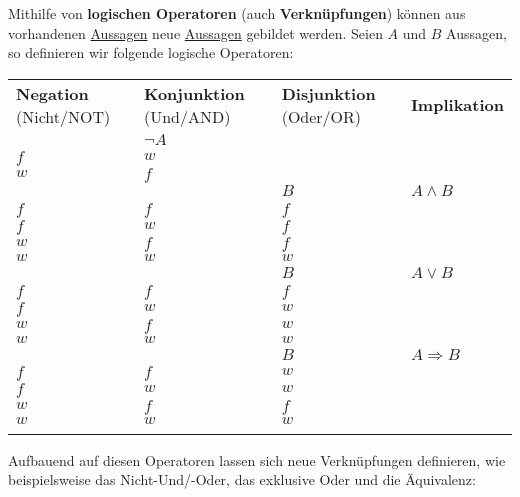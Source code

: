 \documentclass[../../main.tex]{subfiles}
\begin{document}
	\begin{definition}
		\label{def:LogischeOperatoren}
		Mithilfe von \textbf{logischen Operatoren} (auch \textbf{Verknüpfungen}) können aus vorhandenen \hyperref[def:Aussage]{Aussagen} neue \hyperref[def:Aussage]{Aussagen} gebildet werden. Seien $A$ und $B$ Aussagen, so definieren wir folgende logische Operatoren: \\
		
		\begin{longtable}{p{28mm}p{28mm}p{28mm}p{28mm}}
			\textbf{Negation} (Nicht/NOT)
			&
			\textbf{Konjunktion} (Und/AND)
			&
			\textbf{Disjunktion} (Oder/OR)
			&
			\textbf{Implikation}
			\\
			\begin{tabular}[b]{c|c}
				$A$ & $\lnot A$ \\ 
				\hline 
				$f$ & $w$ \\ 
				\hline 
				$w$ & $f$ \\ 
			\end{tabular} 
			&
			\begin{tabular}{c|c|c}
				$A$ & $B$ & $A \land B$ \\ 
				\hline 
				$f$ & $f$ & $f$ \\ 
				\hline 
				$f$ & $w$ & $f$ \\ 
				\hline 
				$w$ & $f$ & $f$ \\ 
				\hline 
				$w$ & $w$ & $w$ \\ 
			\end{tabular} 
			&
			\begin{tabular}{c|c|c}
				$A$ & $B$ & $A \lor B$ \\ 
				\hline 
				$f$ & $f$ & $f$ \\ 
				\hline 
				$f$ & $w$ & $w$ \\ 
				\hline 
				$w$ & $f$ & $w$ \\ 
				\hline 
				$w$ & $w$ & $w$ \\ 
			\end{tabular} 
			&
			\begin{tabular}{c|c|c}
				$A$ & $B$ & $A \Rightarrow B$ \\ 
				\hline 
				$f$ & $f$ & $w$ \\ 
				\hline 
				$f$ & $w$ & $w$ \\ 
				\hline 
				$w$ & $f$ & $f$ \\ 
				\hline 
				$w$ & $w$ & $w$ \\ 
			\end{tabular} 
		\end{longtable}
		Aufbauend auf diesen Operatoren lassen sich neue Verknüpfungen definieren, wie beispielsweise das Nicht-Und/-Oder, das exklusive Oder und die Äquivalenz: \\
		

\end{definition}
\end{document}
